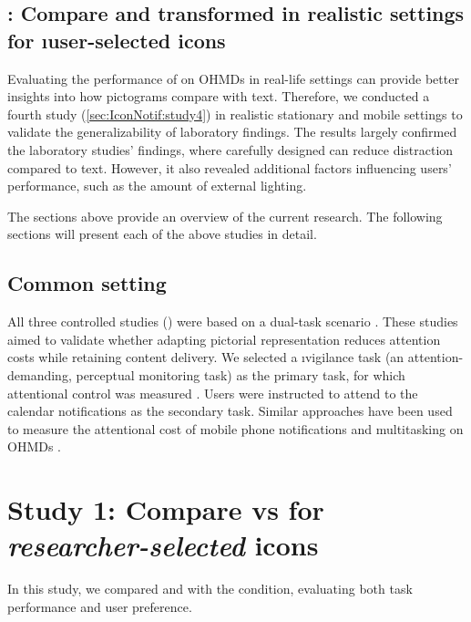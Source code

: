 \subsection{\Studyfour{}: Compare  and transformed  in realistic settings for \i{user-selected} icons}

Evaluating the performance of  on OHMDs in real-life settings can provide better insights into how pictograms compare with text. Therefore, we conducted a fourth study (\autoref{sec:IconNotif:study4}) in realistic stationary and mobile settings to validate the generalizability of laboratory findings. The results largely confirmed the laboratory studies' findings, where carefully designed  can reduce distraction compared to text. However, it also revealed additional factors influencing users' performance, such as the amount of external lighting.

The sections above provide an overview of the current research. The following sections will present each of the above studies in detail.


\subsection{Common setting}

All three controlled studies () were based on a dual-task scenario \cite{pashler_dual_task_1994}. These studies aimed to validate whether adapting pictorial representation reduces attention costs while retaining content delivery. We selected a \i{vigilance task} (an attention-demanding, perceptual monitoring task) as the primary task, for which attentional control was measured \cite{ramachandran_vigilance_2002, redick_cognitive_2016}. Users were instructed to attend to the calendar notifications as the secondary task. Similar approaches have been used to measure the attentional cost of mobile phone notifications \cite{stothart_attentional_2015} and multitasking on OHMDs \cite{mustonen_visual_2013, klose_text_2019}.








\section{Study 1: Compare  vs  for \textit{researcher-selected} icons}
\label{sec:IconNotif:study1}

In this study, we compared  and  with the \nonotif{} condition, evaluating both task performance and user preference. 

